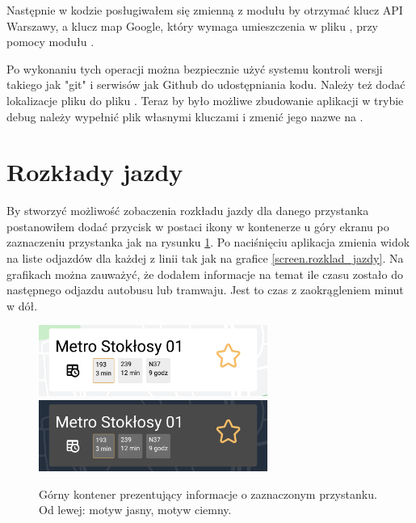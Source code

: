 \documentclass{SGGW-thesis}
\begin{document}
Następnie w kodzie posługiwałem się zmienną  z modułu  by otrzymać klucz API Warszawy,
a klucz map Google, który wymaga umieszczenia w pliku , przy pomocy modułu .

Po wykonaniu tych operacji można bezpiecznie użyć systemu kontroli wersji takiego jak "git" i serwisów jak Github do udostępniania kodu.
Należy też dodać lokalizacje pliku  do pliku .
Teraz by było możliwe zbudowanie aplikacji w trybie debug należy wypełnić plik  własnymi kluczami i zmenić jego nazwe na .

\section{Rozkłady jazdy}
By stworzyć możliwość zobaczenia rozkładu jazdy dla danego przystanka postanowiłem dodać przycisk w postaci ikony w kontenerze u góry ekranu po zaznaczeniu przystanka jak na rysunku \ref{screen.topbox}.
Po naciśnięciu aplikacja zmienia widok na liste odjazdów dla każdej z linii tak jak na grafice \ref{screen.rozklad_jazdy}.
Na grafikach można zauważyć, że dodałem informacje na temat ile czasu zostało do następnego odjazdu autobusu lub tramwaju.
Jest to czas z zaokrągleniem minut w dół.
\begin{figure}[h]
  \centering
  \includegraphics[width=75mm]{screeny/topbox_jasny}
  \enspace
  \includegraphics[width=75mm]{screeny/topbox_ciemny}
  \caption[Górny kontener]{
    \label{screen.topbox}
    Górny kontener prezentujący informacje o zaznaczonym przystanku. Od lewej: motyw jasny, motyw ciemny. \vspace{2ex}
  }
\end{figure}
\end{document}
